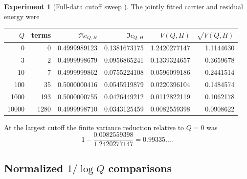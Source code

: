 \documentclass[11pt]{amsart}
\numberwithin{equation}{section}
\theoremstyle{plain}
\theoremstyle{definition}
\newtheorem{experiment}[theorem]{Experiment}
\theoremstyle{remark}
\newcommand{\1}{\mathbf{1}}
\begin{document}
\begin{experiment}[Full-data cutoff sweep {\normalfont[Numerical]}]
\label{exp:full_data_sweep}
The jointly fitted carrier and residual energy were
\begin{center}
\begin{tabular}{rrrrrr}
\toprule
$Q$ & terms & $\Re c_{Q,H}$ & $\Im c_{Q,H}$ & $V(Q,H)$ & $\sqrt{V(Q,H)}$\\
\midrule
0 & 0 & 0.4999989123 & 0.1381673175 & 1.2420277147 & 1.1144630\\
3 & 2 & 0.4999998679 & 0.0956865241 & 0.1339324657 & 0.3659678\\
10 & 7 & 0.4999999862 & 0.0755224108 & 0.0596099186 & 0.2441514\\
100 & 35 & 0.5000000416 & 0.0545919879 & 0.0220396104 & 0.1484574\\
1000 & 193 & 0.5000000755 & 0.0426449212 & 0.0112822119 & 0.1062178\\
10000 & 1280 & 0.4999998710 & 0.0343125459 & 0.0082559398 & 0.0908622\\
\bottomrule
\end{tabular}
\end{center}
At the largest cutoff the finite variance reduction relative to $Q=0$ was
\begin{equation}
1-\frac{0.0082559398}{1.2420277147}
=0.99335\ldots.
\label{eq:numerical_variance_reduction_detailed}
\end{equation}
\end{experiment}

\subsection{Normalized \texorpdfstring{\(1/\log Q\)}{1/log Q} comparisons}
\label{subsec:numerical_normalized_scaling}
\end{document}
